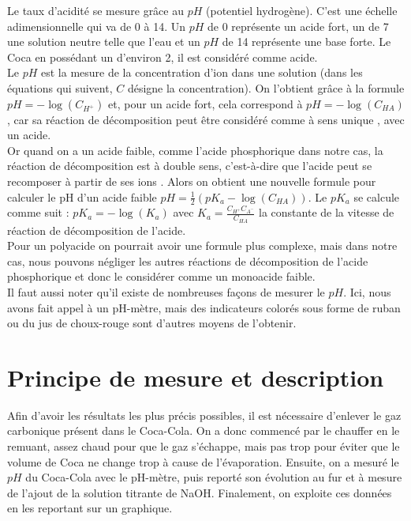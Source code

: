 \documentclass[11pt]{article}
\begin{document}
Le taux d'acidité se mesure grâce au $pH$ (potentiel hydrogène).
C'est une échelle adimensionnelle qui va de 0 à 14.
Un $pH$ de 0 représente un acide fort, un de 7 une solution neutre telle que l'eau et un $pH$ de 14 représente
 une base forte.
Le Coca en possédant un d'environ 2, il est considéré comme acide.\\
Le $pH$ est la mesure de la concentration d'ion  dans une solution (dans les équations qui suivent, $C$
désigne la concentration).
On l'obtient grâce à la formule $pH= - \log(C_{H^+})$ et, pour un acide fort, cela correspond à
$pH= - \log(C_{HA})$, car sa réaction de décomposition peut être considéré comme à sens unique
, avec  un acide.\\
Or quand on a un acide faible, comme l'acide phosphorique dans notre cas, la réaction de décomposition est
à double sens, c'est-à-dire que l'acide peut se recomposer à partir de ses ions
.
Alors on obtient une nouvelle formule pour calculer le pH d'un acide faible $pH = \frac{1}{2} (pK_a - \log(C_{HA}))$.
Le $pK_a$ se calcule comme suit : $pK_a = - \log(K_a)$ avec $K_a = \frac{C_{H^+}C_{A^-}}{C_{HA}}$ la constante de la
vitesse de réaction de décomposition de l'acide.\\
Pour un polyacide on pourrait avoir une formule plus complexe, mais dans notre cas, nous pouvons négliger
les autres réactions de décomposition de l'acide phosphorique et donc le considérer comme un monoacide faible.\\
Il faut aussi noter qu'il existe de nombreuses façons de mesurer le $pH$\@.
Ici, nous avons fait appel à un pH-mètre, mais des indicateurs colorés sous forme de ruban ou du jus de
choux-rouge sont d'autres moyens de l'obtenir.

\section{Principe de mesure et description}\label{sec:principe-de-mesure-et-description}

Afin d'avoir les résultats les plus précis possibles, il est nécessaire d'enlever le gaz carbonique présent
dans le Coca-Cola.
On a donc commencé par le chauffer en le remuant, assez chaud pour que le gaz s'échappe, mais pas trop pour
éviter que le volume de Coca ne change trop à cause de l'évaporation.
Ensuite, on a mesuré le $pH$ du Coca-Cola avec le pH-mètre, puis reporté son évolution au fur et à mesure
de l'ajout de la solution titrante de NaOH\@.
Finalement, on exploite ces données en les reportant sur un graphique.
\end{document}
